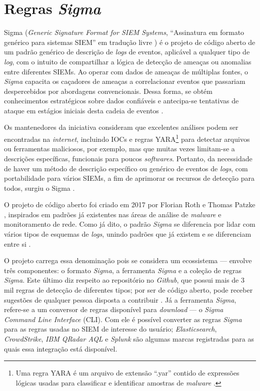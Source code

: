 \section{Regras \textit{Sigma}}

Sigma (\textit{Generic Signature Format for SIEM Systems}, ``Assinatura em formato genérico para sistemas SIEM'' em tradução livre \cite{SigmaReadMe}) 
é o projeto de código aberto de um padrão genérico de descrição de \textit{logs} de eventos, aplicável a qualquer tipo de \textit{log},
com o intuito de compartilhar a lógica de detecção de ameaças ou anomalias entre diferentes SIEMs. 
Ao operar com dados de ameaças de múltiplas fontes, o \textit{Sigma} capacita os caçadores de ameaças a correlacionar eventos que passariam despercebidos por abordagens convencionais. 
Dessa forma, se obtém conhecimentos estratégicos sobre dados confiáveis e antecipa-se tentativas de ataque em estágios iniciais desta cadeia de eventos \cite{Splunk1}.

Os mantenedores da iniciativa consideram que excelentes análises podem ser encontradas na \textit{internet}, incluindo IOCs e regras YARA\footnote{Uma regra YARA é um arquivo de extensão ``.yar'' contido de expressões lógicas usadas para classificar e identificar amostras de \textit{malware} \cite{PicusSecurity}.} para detectar arquivos ou ferramentas maliciosos, por exemplo, mas que muitas vezes limitam-se a descrições específicas, funcionais para poucos \textit{softwares}.
Portanto, da necessidade de haver um método de descrição específico ou genérico de eventos de \textit{logs}, com portabilidade para vários SIEMs, a fim de aprimorar os recursos de detecção para todos, surgiu o Sigma \cite{SigmaReadMe}.

O projeto de código aberto foi criado em 2017 por Florian Roth e Thomas Patzke \cite{AboutSigma}, inspirados em padrões já existentes nas áreas de análise de \textit{malware} e monitoramento de rede. Como já dito, o padrão \textit{Sigma} se diferencia por lidar com vários tipos de esquemas de \textit{logs}, unindo padrões que já existem e se diferenciam entre si \cite{Splunk1}. 

O projeto carrega essa denominação pois se considera um ecossistema --- envolve três componentes: o formato \textit{Sigma}, a ferramenta \textit{Sigma} e a coleção de regras \textit{Sigma}. 
Este último diz respeito ao repositório no \textit{Github}, que possui mais de 3 mil regras de detecção de diferentes tipos; 
por ser de código aberto, pode receber sugestões de qualquer pessoa disposta a contribuir \cite{SigmaReadMe}. 
Já a ferramenta \textit{Sigma}, refere-se a um conversor de regras disponível para \textit{download} --- o \textit{Sigma Command Line Interface} (CLI). 
Com ele é possível converter as regras \textit{Sigma} para as regras usadas no SIEM de interesse do usuário; 
\textit{Elasticsearch}, \textit{CrowdStrike}, \textit{IBM QRadar AQL} e \textit{Splunk} são algumas marcas registradas para as quais essa integração está disponível.

